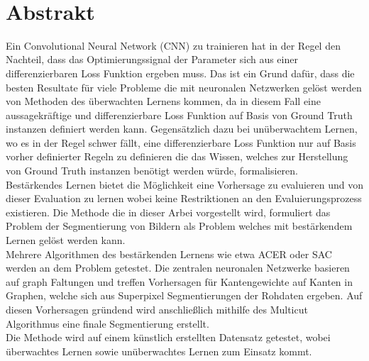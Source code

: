 ~\label{sec:ref}
\section*{Abstrakt}
Ein Convolutional Neural Network (CNN) zu trainieren hat in der Regel den Nachteil, dass das Optimierungssignal der Parameter sich aus einer differenzierbaren Loss Funktion ergeben muss. Das ist ein Grund dafür, dass die besten Resultate für viele Probleme die mit neuronalen Netzwerken gelöst werden von Methoden des überwachten Lernens kommen, da in diesem Fall eine aussagekräftige und differenzierbare Loss Funktion auf Basis von Ground Truth instanzen definiert werden kann. Gegensätzlich dazu bei unüberwachtem Lernen, wo es in der Regel schwer fällt, eine differenzierbare Loss Funktion nur auf Basis vorher definierter Regeln zu definieren die das Wissen, welches zur Herstellung von Ground Truth instanzen benötigt werden würde, formalisieren.\\
Bestärkendes Lernen bietet die Möglichkeit eine Vorhersage zu evaluieren und von dieser Evaluation zu lernen wobei keine Restriktionen an den Evaluierungsprozess existieren. Die Methode die in dieser Arbei vorgestellt wird, formuliert das Problem der Segmentierung von Bildern als Problem welches mit bestärkendem Lernen gelöst werden kann.\\
Mehrere Algorithmen des bestärkenden Lernens wie etwa ACER \cite{wang2016sample} oder SAC \cite{haarnoja2018soft} werden an dem Problem getestet. Die zentralen neuronalen Netzwerke basieren auf graph Faltungen und treffen Vorhersagen für Kantengewichte auf Kanten in Graphen, welche sich aus Superpixel Segmentierungen der Rohdaten ergeben. Auf diesen Vorhersagen gründend wird anschließlich mithilfe des Multicut Algorithmus eine finale Segmentierung erstellt.\\
Die Methode wird auf einem künstlich erstellten Datensatz getestet, wobei überwachtes Lernen sowie unüberwachtes Lernen zum Einsatz kommt.
